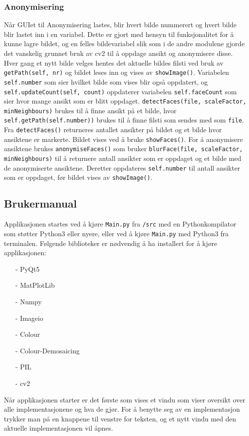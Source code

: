 \subsubsection{Anonymisering}
Når GUIet til Anonymisering lastes, blir hvert bilde nummerert og hvert bilde blir lastet inn i en variabel. Dette er gjort med hensyn til funksjonalitet for å kunne lagre bildet, og en felles bildevariabel slik som i de andre modulene gjorde det vanskelig grunnet bruk av cv2 til å oppdage ansikt og anonymisere disse. Hver gang et nytt bilde velges hentes det aktuelle bildes filsti ved bruk av \texttt{getPath(self, nr)} og bildet leses inn og vises av \texttt{showImage()}. Variabelen \texttt{self.number} som sier hvilket bilde som vises blir også oppdatert, og \texttt{self.updateCount(self, count)} oppdaterer variabelen \texttt{self.faceCount} som sier hvor mange ansikt som er blitt oppdaget. \texttt{detectFaces(file, scaleFactor, minNeighbours)} brukes til å finne ansikt på et bilde, hvor \texttt{self.getPath(self.number))} brukes til å finne filsti som sendes med som \texttt{file}. Fra \texttt{detectFaces()} returneres antallet ansikter på bildet og et bilde hvor ansiktene er markerte. Bildet vises ved å bruke \texttt{showFaces()}. For å anonymisere ansiktene brukes \texttt{anonymiseFaces()} som bruker \texttt{blurFace(file, scaleFactor, minNeighbours)} til å returnere antall ansikter som er oppdaget og et bilde med de anonymiserte ansiktene. Deretter oppdateres \texttt{self.number} til antall ansikter som er oppdaget, før bildet vises av \texttt{showImage()}.

\subsection{Brukermanual}
Applikasjonen startes ved å kjøre \texttt{Main.py} fra \texttt{/src} med en Pythonkompilator som støtter Python3 eller nyere, eller ved å kjøre \texttt{Main.py} med Python3 fra terminalen. Følgende biblioteker er nødvendig å ha installert for å kjøre applikasjonen:
\begin{itemize}[noitemsep,topsep=0pt,parsep=0pt,partopsep=0pt]
  \item[-] PyQt5
  \item[-] MatPlotLib
  \item[-] Numpy
  \item[-] Imageio
  \item[-] Colour
  \item[-] Colour-Demosaicing
  \item[-] PIL
  \item[-] cv2
\end{itemize}
Når applikasjonen starter er det første som vises et vindu som viser oversikt over alle implementasjonene og hva de gjør. For å benytte seg av en implementasjon trykker man på en knappene til venstre for teksten, og et nytt vindu med den aktuelle implementasjonen vil åpnes. 

